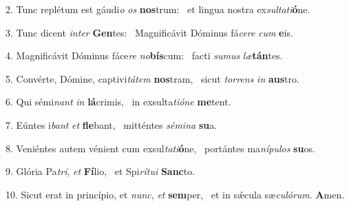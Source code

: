 2. Tunc replétum est gáudi\textit{o} \textit{os} \textbf{nos}trum: \ast\  et lingua nostra ex\textit{sul}\textit{ta}\textit{ti}\textbf{ó}ne.\

3. Tunc dicent \textit{in}\textit{ter} \textbf{Gen}tes: \ast\  Magnificávit Dóminus fá\textit{ce}\textit{re} \textit{cum} \textbf{e}is.\

4. Magnificávit Dóminus fáce\textit{re} \textit{no}\textbf{bís}cum: \ast\  facti \textit{su}\textit{mus} \textit{læ}\textbf{tán}tes.\

5. Convérte, Dómine, captivi\textit{tá}\textit{tem} \textbf{nos}tram, \ast\  sicut \textit{tor}\textit{rens} \textit{in} \textbf{aus}tro.\

6. Qui sémi\textit{nant} \textit{in} \textbf{lá}crimis, \ast\  in exsulta\textit{ti}\textit{ó}\textit{ne} \textbf{me}tent.\

7. Eúntes i\textit{bant} \textit{et} \textbf{fle}bant, \ast\  mitténtes \textit{sé}\textit{mi}\textit{na} \textbf{su}a.\

8. Veniéntes autem vénient cum exsul\textit{ta}\textit{ti}\textbf{ó}ne, \ast\  portántes ma\textit{ní}\textit{pu}\textit{los} \textbf{su}os.\

9. Glória Pa\textit{tri}, \textit{et} \textbf{Fí}lio, \ast\  et Spi\textit{rí}\textit{tu}\textit{i} \textbf{Sanc}to.\

10. Sicut erat in princípio, et \textit{nunc}, \textit{et} \textbf{sem}per, \ast\  et in sǽcula sæ\textit{cu}\textit{ló}\textit{rum}. \textbf{A}men.\

